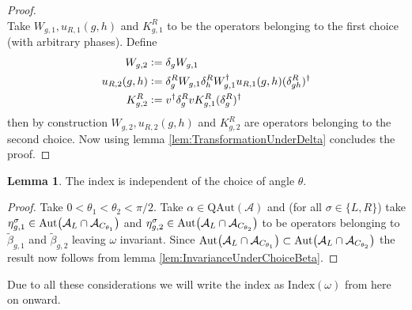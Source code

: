 \documentclass[12pt,a4paper,twoside]{article}
\newcommand{\defeq}{\vcentcolon=}
\let\originalleft\left
\let\originalright\right
\renewcommand{\left}{\mathopen{}\mathclose\bgroup\originalleft}
\renewcommand{\right}{\aftergroup\egroup\originalright}
\renewcommand{\AA}{\mathcal A}
\newcommand{\Aut}[1]{\textrm{Aut}\left(#1\right)}
\theoremstyle{definition}
\newtheorem{lemma}[theorem]{Lemma}
\numberwithin{equation}{section}
\begin{document}
\begin{proof}
\begin{equation}
	\end{equation}
	Take $W_{g,1},u_{R,1}(g,h)$ and $K^R_{g,1}$ to be the operators belonging to the first choice (with arbitrary phases). Define
	\begin{align}
		W_{g,2}&\defeq\delta_g W_{g,1}\\
		u_{R,2}(g,h)&\defeq \delta_g^R W_{g,1}\delta_h^R W_{g,1}^\dagger u_{R,1}(g,h)(\delta_{gh}^R)^\dagger\\
		K^R_{g,2}&\defeq v^\dagger \delta_g^R v K_{g,1}^R (\delta_g^R)^\dagger
	\end{align}
	then by construction $W_{g,2},u_{R,2}(g,h)$ and $K^R_{g,2}$ are operators belonging to the second choice. Now using lemma \ref{lem:TransformationUnderDelta} concludes the proof.
\end{proof}
\begin{lemma}
	The index is independent of the choice of angle $\theta$.
\end{lemma}
\begin{proof}
	Take $0<\theta_1<\theta_2<\pi/2$. Take $\alpha\in \textrm{QAut}(\AA)$ and (for all $\sigma\in\{L,R\}$) take $\eta_{g,1}^\sigma\in\Aut{\AA_L\cap\AA_{C_{\theta_1}}}$ and $\eta_{g,2}^\sigma\in\Aut{\AA_L\cap\AA_{C_{\theta_2}}}$ to be operators belonging to $\tilde{\beta}_{g,1}$ and $\tilde{\beta}_{g,2}$ leaving $\omega$ invariant. Since $\Aut{\AA_L\cap\AA_{C_{\theta_1}}}\subset \Aut{\AA_L\cap\AA_{C_{\theta_2}}}$ the result now follows from lemma \ref{lem:InvarianceUnderChoiceBeta}.
\end{proof}
Due to all these considerations we will write the index as $\textrm{Index}(\omega)$ from here on onward.
\end{document}
